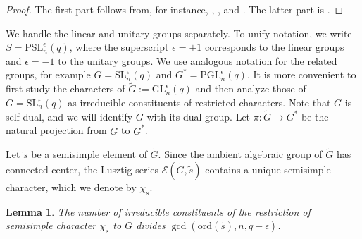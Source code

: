 \documentclass[12pt]{amsart}
\newtheorem{lemma}[theorem]{Lemma}
\theoremstyle{definition}
\numberwithin{equation}{section}
\newcommand{\GL}{{\mathrm {GL}}}
\newcommand{\PGL}{{\mathrm {PGL}}}
\newcommand{\SL}{{\mathrm {SL}}}
\newcommand{\PSL}{{\mathrm {PSL}}}
\newcommand{\ord}{{\mathrm {ord}}}
\begin{document}
\begin{proof}
The first part follows from, for instance,
\cite[Proposition~24.21]{malletesterman}, \cite[Lemma~2.2]{M07}, and
\cite[Lemma~5.8]{Hung22}. The latter part is
\cite[Lemma~4.2]{GHSV21}.
\end{proof}

We handle the linear and unitary groups separately. To unify
notation, we write $S=\PSL_n^\epsilon(q)$, where the superscript
$\epsilon=+1$ corresponds to the linear groups and $\epsilon=-1$ to
the unitary groups. We use analogous notation for the related
groups, for example $G=\SL_n^\epsilon(q)$ and
$G^*=\PGL_n^\epsilon(q)$. It is more convenient to first study the
characters of $\widetilde{G}:=\GL_n^\epsilon(q)$ and then analyze
those of $G=\SL_n^\epsilon(q)$ as irreducible constituents of
restricted characters. Note that $\widetilde{G}$ is self-dual, and
we will identify $\widetilde{G}$ with its dual group. Let
$\pi:\widetilde{G}\to G^*$ be the natural projection from
$\widetilde{G}$ to $G^*$.

Let $\widetilde{s}$ be a semisimple element of $\widetilde{G}$.
Since the ambient algebraic group of $\widetilde{G}$ has connected
center, the Lusztig series
$\mathcal{E}(\widetilde{G},\widetilde{s})$ contains a unique
semisimple character, which we denote by $\chi_{\widetilde{s}}$.

\begin{lemma}\label{lem:numberofconstituents}
The number of irreducible constituents of the restriction of
semisimple character $\chi_{\widetilde{s}}$ to $G$ divides
$\gcd(\ord(\widetilde{s}),n,q-\epsilon)$.
\end{lemma}
\end{document}
